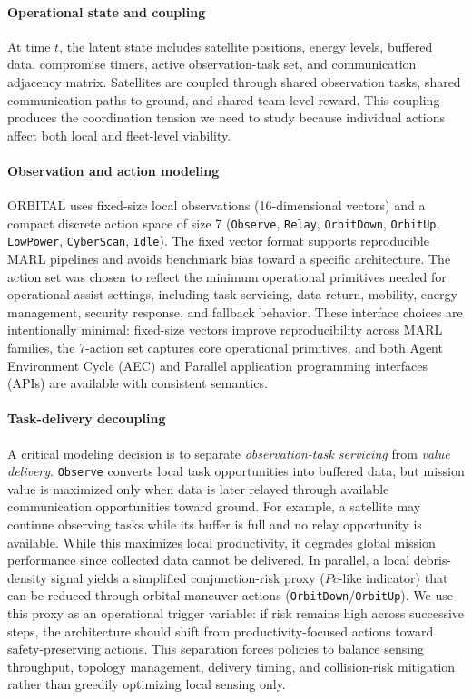 \documentclass[sigconf]{aamas}
\begin{document}
\paragraph{Operational state and coupling}
At time $t$, the latent state includes satellite positions, energy levels, buffered data, compromise timers, active observation-task set, and communication adjacency matrix. Satellites are coupled through shared observation tasks, shared communication paths to ground, and shared team-level reward. This coupling produces the coordination tension we need to study because individual actions affect both local and fleet-level viability.

\paragraph{Observation and action modeling}
ORBITAL uses fixed-size local observations (16-dimensional vectors) and a compact discrete action space of size 7 (\texttt{Observe}, \texttt{Relay}, \texttt{OrbitDown}, \texttt{OrbitUp}, \texttt{LowPower}, \texttt{CyberScan}, \texttt{Idle}). The fixed vector format supports reproducible MARL pipelines and avoids benchmark bias toward a specific architecture. The action set was chosen to reflect the minimum operational primitives needed for operational-assist settings, including task servicing, data return, mobility, energy management, security response, and fallback behavior. These interface choices are intentionally minimal: fixed-size vectors improve reproducibility across MARL families, the 7-action set captures core operational primitives, and both Agent Environment Cycle (AEC) and Parallel application programming interfaces (APIs) are available with consistent semantics.

\paragraph{Task-delivery decoupling}
A critical modeling decision is to separate \emph{observation-task servicing} from \emph{value delivery}. \texttt{Observe} converts local task opportunities into buffered data, but mission value is maximized only when data is later relayed through available communication opportunities toward ground. For example, a satellite may continue observing tasks while its buffer is full and no relay opportunity is available. While this maximizes local productivity, it degrades global mission performance since collected data cannot be delivered. In parallel, a local debris-density signal yields a simplified conjunction-risk proxy ($Pc$-like indicator) that can be reduced through orbital maneuver actions (\texttt{OrbitDown}/\texttt{OrbitUp}). We use this proxy as an operational trigger variable: if risk remains high across successive steps, the architecture should shift from productivity-focused actions toward safety-preserving actions. This separation forces policies to balance sensing throughput, topology management, delivery timing, and collision-risk mitigation rather than greedily optimizing local sensing only.
\end{document}
